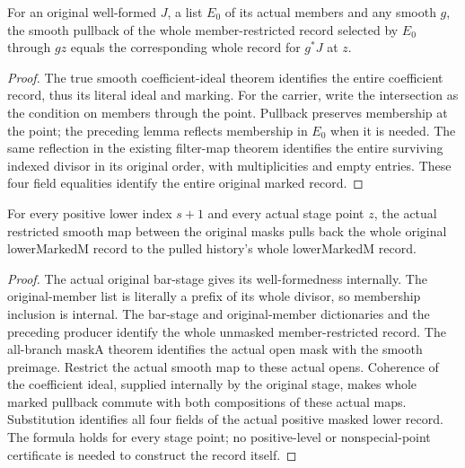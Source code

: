 \begin{theorem}
\label{hir:smooth-positive-lower-whole-member-record}
\leanok
{}
For an original well-formed $J$, a list $E_0$ of its actual members and
any smooth $g$, the smooth pullback of the whole member-restricted record
selected by $E_0$ through $gz$ equals the corresponding whole record
for $g^*J$ at $z$.
\end{theorem}
\begin{proof}
The true smooth coefficient-ideal theorem identifies the entire
coefficient record, thus its literal ideal and marking. For the carrier,
write the intersection as the condition on members through the point.
Pullback preserves membership at the point; the preceding lemma reflects
membership in $E_0$ when it is needed. The same reflection in the existing
filter-map theorem identifies the entire surviving indexed divisor in
its original order, with multiplicities and empty entries. These four
field equalities identify the entire original marked record.
\end{proof}

\begin{theorem}
\label{hir:smooth-positive-lower-actual-mask-record}
\leanok
{}
For every positive lower index $s+1$ and every actual stage point $z$,
the actual restricted smooth map between the original masks pulls back
the whole original lowerMarkedM record to the pulled history's whole
lowerMarkedM record.
\end{theorem}
\begin{proof}
The actual original bar-stage gives its well-formedness internally.
The original-member list is literally a prefix of its whole divisor,
so membership inclusion is internal. The bar-stage and original-member
dictionaries and the preceding producer identify the whole unmasked
member-restricted record. The all-branch maskA theorem identifies the
actual open mask with the smooth preimage. Restrict the actual smooth map
to these actual opens. Coherence of the coefficient ideal, supplied
internally by the original stage, makes whole marked pullback commute
with both compositions of these actual maps. Substitution identifies all
four fields of the actual positive masked lower record. The formula
holds for every stage point; no positive-level or nonspecial-point
certificate is needed to construct the record itself.
\end{proof}

